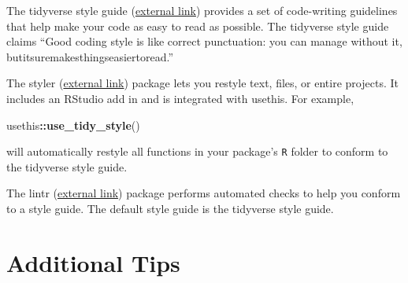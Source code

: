 \documentclass[
]{book}
\newenvironment{Shaded}{\begin{snugshade}}{\end{snugshade}}
\newcommand{\KeywordTok}[1]{\textcolor[rgb]{0.13,0.29,0.53}{\textbf{#1}}}
\newcommand{\NormalTok}[1]{#1}
\newcommand{\OperatorTok}[1]{\textcolor[rgb]{0.81,0.36,0.00}{\textbf{#1}}}
\begin{document}
The tidyverse style guide (\href{https://style.tidyverse.org/}{external link}) provides a set of code-writing guidelines that help make your code as easy to read as possible. The tidyverse style guide claims ``Good coding style is like correct punctuation: you can manage without it, butitsuremakesthingseasiertoread.''

The styler (\href{https://styler.r-lib.org/}{external link}) package lets you restyle text, files, or entire projects. It includes an RStudio add in and is integrated with usethis. For example,

\begin{Shaded}
\begin{Highlighting}[]
\NormalTok{usethis}\OperatorTok{::}\KeywordTok{use_tidy_style}\NormalTok{()}
\end{Highlighting}
\end{Shaded}

will automatically restyle all functions in your package's \texttt{R} folder to conform to the tidyverse style guide.

The lintr (\href{https://github.com/jimhester/lintr}{external link}) package performs automated checks to help you conform to a style guide. The default style guide is the tidyverse style guide.

\hypertarget{add-tips}{%
\section{Additional Tips}\label{add-tips}}
\end{document}
